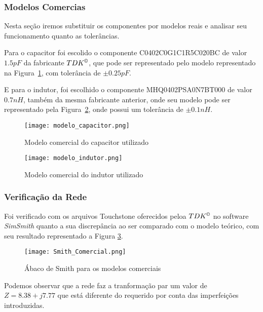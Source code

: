 \documentclass[a4paper,12pt]{proc}
\begin{document}
\subsubsection{Modelos Comercias}
Nesta seção iremos substituir os componentes por modelos reais e analisar seu funcionamento quanto as tolerâncias.

\noindent Para o capacitor foi escolido o componente \textmd{C0402C0G1C1R5C020BC} de valor $1.5pF$ da fabricante $TDK^{\copyright}$, que pode ser representado pelo modelo representado na Figura~\ref{cap_model}, com tolerância de $\pm 0.25pF$.

\singlespacing

\noindent E para o indutor, foi escolhido o componente \textmd{MHQ0402PSA0N7BT000} de valor $0.7 nH$, também da mesma fabricante anterior, onde seu modelo pode ser representado pela Figura~\ref{ind_model}, onde possui um tolerância de $\pm 0.1nH$.


\begin{figure}[htbp]
    \centering
    \texttt{[image: modelo\_capacitor.png]}
    \caption{Modelo comercial do capacitor utilizado}
    \label{cap_model}
\end{figure}

\begin{figure}[htbp]
    \centering
    \texttt{[image: modelo\_indutor.png]}
    \caption{Modelo comercial do indutor utilizado}
    \label{ind_model}
\end{figure}

\subsubsection{Verificação da Rede}

\noindent Foi verificado com os arquivos Touchstone oferecidos peloa $TDK^{\copyright}$ no software \textit{SimSmith} quanto a sua discrepância ao ser comparado com o modelo teórico, com seu resultado representado a Figura \ref{smith_comercial}.

\begin{figure}[htbp]
    \centering
    \texttt{[image: Smith\_Comercial.png]}
    \caption{Ábaco de Smith para os modelos comerciais}
    \label{smith_comercial}
\end{figure}

\noindent Podemos observar que a rede faz a tranformação par um valor de $Z =8.38 +j7.77$ que está diferente do requerido por conta das imperfeições introduzidas.
\end{document}
